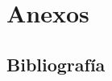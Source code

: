 \documentclass[12pt, a4paper, titlepage]{article}
\begin{document}


\clearpage
\section{Anexos}
\subsection{Bibliografía}

\printbibliography
\end{document}
